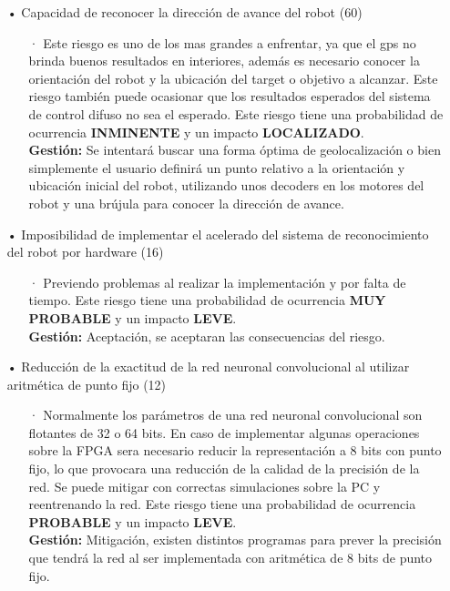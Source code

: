 \begin{itemize}
        \item[•] Capacidad de reconocer la dirección de avance del robot (60)
        \begin{itemize}
            \item[·] Este riesgo es uno de los mas grandes a enfrentar, ya que el gps no brinda buenos resultados en interiores, además es necesario conocer la orientación del robot y la ubicación del target o objetivo a alcanzar.
            Este riesgo también puede ocasionar que los resultados esperados del sistema de control difuso no sea el esperado. Este riesgo tiene una probabilidad de ocurrencia \textbf{INMINENTE} y un impacto \textbf{LOCALIZADO}.\\
            \textbf{Gestión:} Se intentará buscar una forma óptima de geolocalización o bien simplemente el usuario definirá un punto relativo a la orientación y ubicación inicial del robot, utilizando unos decoders en los motores del robot y una brújula para conocer la dirección de avance. 
        \end{itemize}
        
        \item[•] Imposibilidad de implementar el acelerado del sistema de reconocimiento del robot por hardware (16)
        \begin{itemize}
            \item[·] Previendo problemas al realizar la implementación y por falta de tiempo. Este riesgo tiene una probabilidad de ocurrencia \textbf{MUY PROBABLE} y un impacto \textbf{LEVE}.\\
            \textbf{Gestión:} Aceptación, se aceptaran las consecuencias del riesgo. 
        \end{itemize}
        
        \item[•] Reducción de la exactitud de la red neuronal convolucional al utilizar aritmética de punto fijo (12)
        \begin{itemize}
            \item[·] Normalmente los parámetros de una red neuronal convolucional son flotantes de 32 o 64 bits. En caso de implementar algunas operaciones sobre la FPGA sera necesario reducir la representación a 8 bits con punto fijo, lo que provocara una reducción de la calidad de la precisión de la red. Se puede mitigar con correctas simulaciones sobre la PC y reentrenando la red. Este riesgo tiene una probabilidad de ocurrencia \textbf{PROBABLE} y un impacto \textbf{LEVE}.\\
            \textbf{Gestión:} Mitigación, existen distintos programas para prever la precisión que tendrá la red al ser implementada con aritmética de 8 bits de punto fijo.
        \end{itemize}
        

\end{itemize}
